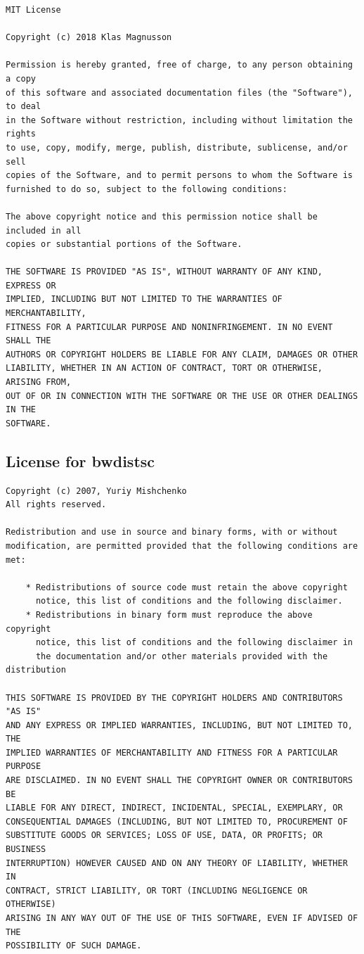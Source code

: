 \documentclass[a4paper, oneside, onecolumn, 11pt]{article}
\begin{document}
\begingroup
\footnotesize
\begin{verbatim}
MIT License

Copyright (c) 2018 Klas Magnusson

Permission is hereby granted, free of charge, to any person obtaining a copy
of this software and associated documentation files (the "Software"), to deal
in the Software without restriction, including without limitation the rights
to use, copy, modify, merge, publish, distribute, sublicense, and/or sell
copies of the Software, and to permit persons to whom the Software is
furnished to do so, subject to the following conditions:

The above copyright notice and this permission notice shall be included in all
copies or substantial portions of the Software.

THE SOFTWARE IS PROVIDED "AS IS", WITHOUT WARRANTY OF ANY KIND, EXPRESS OR
IMPLIED, INCLUDING BUT NOT LIMITED TO THE WARRANTIES OF MERCHANTABILITY,
FITNESS FOR A PARTICULAR PURPOSE AND NONINFRINGEMENT. IN NO EVENT SHALL THE
AUTHORS OR COPYRIGHT HOLDERS BE LIABLE FOR ANY CLAIM, DAMAGES OR OTHER
LIABILITY, WHETHER IN AN ACTION OF CONTRACT, TORT OR OTHERWISE, ARISING FROM,
OUT OF OR IN CONNECTION WITH THE SOFTWARE OR THE USE OR OTHER DEALINGS IN THE
SOFTWARE.
\end{verbatim}
\endgroup

\subsection{License for bwdistsc}
\label{sec:bwdistsc-license}

\begingroup
\footnotesize
\begin{verbatim}
Copyright (c) 2007, Yuriy Mishchenko
All rights reserved.

Redistribution and use in source and binary forms, with or without
modification, are permitted provided that the following conditions are
met:

    * Redistributions of source code must retain the above copyright
      notice, this list of conditions and the following disclaimer.
    * Redistributions in binary form must reproduce the above copyright
      notice, this list of conditions and the following disclaimer in
      the documentation and/or other materials provided with the distribution

THIS SOFTWARE IS PROVIDED BY THE COPYRIGHT HOLDERS AND CONTRIBUTORS "AS IS"
AND ANY EXPRESS OR IMPLIED WARRANTIES, INCLUDING, BUT NOT LIMITED TO, THE
IMPLIED WARRANTIES OF MERCHANTABILITY AND FITNESS FOR A PARTICULAR PURPOSE
ARE DISCLAIMED. IN NO EVENT SHALL THE COPYRIGHT OWNER OR CONTRIBUTORS BE
LIABLE FOR ANY DIRECT, INDIRECT, INCIDENTAL, SPECIAL, EXEMPLARY, OR
CONSEQUENTIAL DAMAGES (INCLUDING, BUT NOT LIMITED TO, PROCUREMENT OF
SUBSTITUTE GOODS OR SERVICES; LOSS OF USE, DATA, OR PROFITS; OR BUSINESS
INTERRUPTION) HOWEVER CAUSED AND ON ANY THEORY OF LIABILITY, WHETHER IN
CONTRACT, STRICT LIABILITY, OR TORT (INCLUDING NEGLIGENCE OR OTHERWISE)
ARISING IN ANY WAY OUT OF THE USE OF THIS SOFTWARE, EVEN IF ADVISED OF THE
POSSIBILITY OF SUCH DAMAGE.
\end{verbatim}
\endgroup
\end{document}
